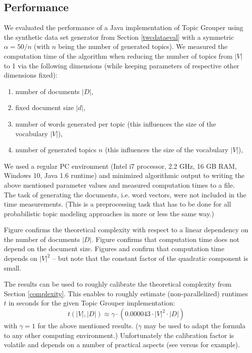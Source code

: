 \documentclass[10pt, a4paper, oneside]{article}
\begin{document}
\subsection{Performance}

We evaluated the performance of a Java implementation of Topic Grouper 
using the synthetic data set generator from Section \ref{twcdataeval} with a symmetric $\alpha = 50 / n$ (with $n$ being the number of generated topics).
We measured the computation time of the algorithm when reducing the number of topics from $|V|$ to 1 via the following dimensions (while keeping  parameters of respective other dimensions fixed):
\begin{enumerate}
\item number of documents $|D|$,
\item fixed document size $|d|$,
\item number of words generated per topic (this influences the size of the vocabulary $|V|$),
\item number of generated topics $n$ (this influences the size of the vocabulary $|V|$),
\end{enumerate}
We used a regular PC environment (Intel i7 processor, 2.2 GHz, 16 GB RAM, Windows 10, Java 1.6 runtime) and minimized algorithmic output to writing the above mentioned parameter values and measured computation times to a file.
The task of generating the documents, i.e. word vectors, were not included in the time measurements.
(This is a preprocessing task that has to be done for all probabilistic topic modeling approaches in more or less the same way.)

Figure \cite{perf1} confirms the theoretical complexity with respect to a linear dependency on the number of documents $|D|$.
Figure \cite{perf2} confirms that computation time does not depend on the document size.
Figures \cite{perf3} and \cite{perf4} confirm that computation time depends on $|V|^2$ -- but note that the constant factor of the quadratic component is small.

The results can be used to roughly calibrate the theoretical complexity from Section \ref{complexity}. This enables to roughly estimate (non-parallelized) runtimes $t$ in seconds for the given Topic Grouper implementation:
\[ t(|V|,|D|) \approx \gamma \cdot (0.000043 \cdot |V|^2 \cdot |D|)\]
with $\gamma = 1$ for the above mentioned results. ($\gamma$ may be used to adapt the formula to any other computing environment.)
Unfortunately the calibration factor is volatile and depends on a number of practical aspects (see \cite{perf3} versus \cite{perf4} for example).
\end{document}
